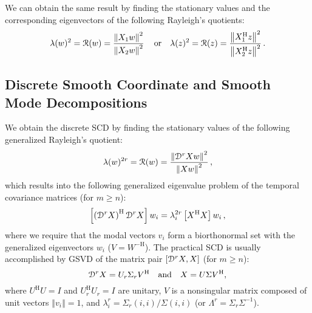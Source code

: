 \documentclass[10pt]{article}
\newcommand{\norm}[1]{\left\Vert#1\right\Vert}
\begin{document}
We can obtain the same result by finding the stationary values and the corresponding eigenvectors of the following Rayleigh's quotients:
\begin{equation}
    \lambda(w)^2={\cal R}(w) = \frac{\norm{X_1w}^2}{\norm{X_2w}^2}\,\quad \mathrm{or} \quad \lambda(z)^2={\cal R}(z) = \frac{\norm{X_1^\mathrm{H}z}^2}{\norm{X_2^\mathrm{H}z}^2}\,.
\end{equation}

\subsection{Discrete Smooth Coordinate and Smooth Mode Decompositions}

We obtain the discrete SCD by finding the stationary values of the following generalized Rayleigh's quotient:
\begin{equation}
    \lambda(w)^{2r}={\cal R}(w) = \frac{\norm{{\cal D}^{r} X w}^2}{\norm{Xw}^2}\,,
\end{equation}
which results into the following generalized eigenvalue problem of the temporal covariance matrices (for $m \ge n$):
\begin{equation}
    \left[\left({\cal D}^{r} X\right)^\mathrm{H}{\cal D}^{r} X\right] w_i=\lambda_{i}^{2r}\left[X^\mathrm{H}X\right] w_i\,,
\end{equation}
where we require that the modal vectors $v_i$ form a biorthonormal set with the generalized eigenvectors $w_i$ ($V=W^\mathrm{-H}$).
The practical SCD is usually accomplished by GSVD of the matrix pair $\left[{\cal D}^{r} X, X\right]$ (for $m \ge n$):
\begin{equation}
    {\cal D}^{r} X = U_r\Sigma_r V^\mathrm{H} \quad \mathrm{and}\quad X = U\Sigma V^\mathrm{H},
\end{equation}
where $U^\mathrm{H}U = I$ and $U_r^\mathrm{H} U_r =I$ are unitary, $V$ is a nonsingular matrix composed of unit vectors $\norm{v_i} = 1$, and $\lambda_{i}^r = \Sigma_r(i,i)/\Sigma(i,i)$ (or $\Lambda^r=\Sigma_r\Sigma^{-1}$).
\end{document}
